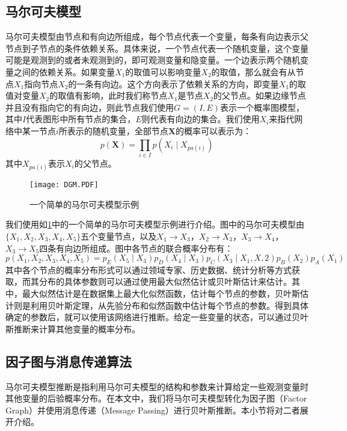 \documentclass{xdupgthesis}
\begin{document}
\subsection{马尔可夫模型}
马尔可夫模型由节点和有向边所组成，每个节点代表一个变量，每条有向边表示父节点到子节点的条件依赖关系。具体来说，一个节点代表一个随机变量，这个变量可能是观测到的或者未观测到的，即可观测变量和隐变量。一个边表示两个随机变量之间的依赖关系。如果变量$X_1$的取值可以影响变量$X_2$的取值，那么就会有从节点$X_1$指向节点$X_2$的一条有向边。这个方向表示了依赖关系的方向，即变量$X_1$的取值对变量$X_2$的取值有影响，此时我们称节点$X_1$是节点$X_2$的父节点。如果边缘节点并且没有指向它的有向边，则此节点我们使用$G=(I,E)$表示一个概率图模型，其中$I$代表图形中所有节点的集合，$E$则代表有向边的集合。我们使用$X_i$来指代网络中某一节点$i$所表示的随机变量，全部节点$\mathbf{X}$的概率可以表示为：
\begin{equation}
    \label{X}
    p\left(\mathbf{X}\right) = \prod_{i \in I}^{}p\left(X_i \mid X_{pa\left(i\right)}\right) 
\end{equation}
其中$X_{pa\left(i\right)}$表示$X_i$的父节点。
\begin{figure}[!htb]
    \centering
    \texttt{[image: DGM.PDF]}
    \caption{一个简单的马尔可夫模型示例}
    \label{DGM}
\end{figure}

我们使用如\ref{DGM}中的一个简单的马尔可夫模型示例进行介绍。图中的马尔可夫模型由$\{X_1,X_2,X_3,X_4,X_5\}$五个变量节点，以及$X_1 \rightarrow X_3$，$X_2 \rightarrow X_3$，$X_3 \rightarrow X_4$，$X_3 \rightarrow X_5$四条有向边所组成。图中各节点的联合概率分布有：
\begin{equation}
    \label{X_1}
    p\left(X_1,X_2,X_3,X_4,X_5\right)=p_E(X_5\mid X_3)p_D(X_4\mid X_3)p_C(X_3\mid X_1,X,2)p_B(X_2)p_A(X_1)
\end{equation}
其中各个节点的概率分布形式可以通过领域专家、历史数据、统计分析等方式获取，而其分布的具体参数则可以通过使用最大似然估计或贝叶斯估计来估计。其中，最大似然估计是在数据集上最大化似然函数，估计每个节点的参数，贝叶斯估计则是利用贝叶斯定理，从先验分布和似然函数中估计每个节点的参数。得到具体确定的参数后，就可以使用该网络进行推断。给定一些变量的状态，可以通过贝叶斯推断来计算其他变量的概率分布。

\subsection{因子图与消息传递算法}
马尔可夫模型推断是指利用马尔可夫模型的结构和参数来计算给定一些观测变量时其他变量的后验概率分布。在本文中，我们将马尔可夫模型转化为因子图（Factor Graph）并使用消息传递（Message Passing）进行贝叶斯推断。本小节将对二者展开介绍。
\end{document}
